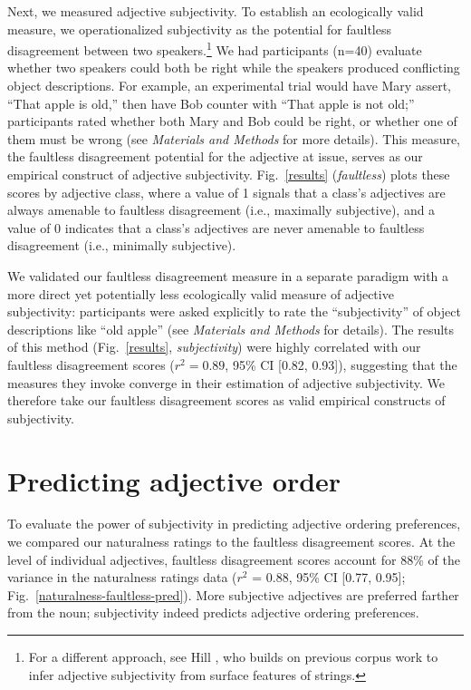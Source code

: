 \documentclass{pnastwo}
\begin{document}
\begin{article}
Next, we measured adjective subjectivity. To establish an ecologically valid measure, we operationalized subjectivity as the potential for faultless disagreement between two speakers.\footnote{For a different approach, see Hill \cite{hill2012}, who builds on previous corpus work \cite{wulff2003} to infer adjective subjectivity from surface features of strings.} We had participants (n=40) evaluate whether two speakers could both be right while the speakers produced conflicting object descriptions. For example, an experimental trial would have Mary assert, ``That apple is old,'' then have Bob counter with ``That apple is not old;'' 
participants rated whether both Mary and Bob could be right, or whether one of them must be wrong (see \emph{Materials and Methods} for more details). This measure, the faultless disagreement potential for the adjective at issue, serves as our empirical construct of adjective subjectivity. Fig.\ \ref{results} (\emph{faultless}) plots these scores by adjective class, where a value of 1 signals that a class's adjectives are always amenable to faultless disagreement (i.e., maximally subjective), and a value of 0 indicates that a class's adjectives are never amenable to faultless disagreement (i.e., minimally subjective).

We validated our faultless disagreement measure in a separate paradigm with a more direct yet potentially less ecologically valid measure of adjective subjectivity: participants were asked explicitly to rate the ``subjectivity'' of object descriptions like ``old apple'' (see \emph{Materials and Methods} for details). The results of this method (Fig.~\ref{results}, \emph{subjectivity}) were highly correlated with our faultless disagreement scores ($r^{2} = 0.89$, 95\% CI [0.82, 0.93]), suggesting that the measures they invoke converge in their estimation of adjective subjectivity. We therefore take our faultless disagreement scores as valid empirical constructs of subjectivity.

\section{Predicting adjective order}

To evaluate the power of subjectivity in predicting adjective ordering preferences, we compared our naturalness ratings to the faultless disagreement scores. At the level of individual adjectives, faultless disagreement scores account for 88\% of the variance in the naturalness ratings data ($r^2$ = 0.88, 95\% CI [0.77, 0.95]; Fig.~\ref{naturalness-faultless-pred}). 
More subjective adjectives are preferred farther from the noun; subjectivity indeed predicts adjective ordering preferences.


\end{article}
\end{document}

